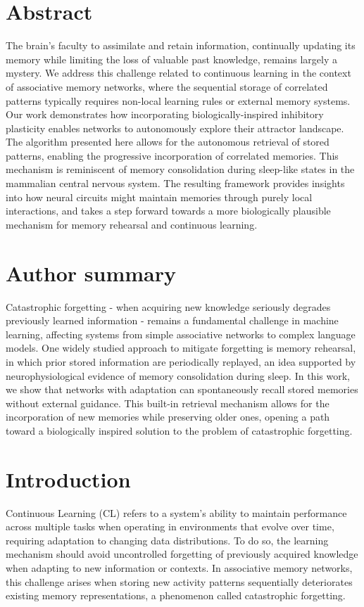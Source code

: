 \documentclass[10pt,letterpaper]{article}
\begin{document}
\section*{Abstract}
The brain's faculty to assimilate and retain information, continually updating its memory while limiting the loss of valuable past knowledge, remains largely a mystery. We address this challenge related to continuous learning in the context of associative memory networks, where the sequential storage of correlated patterns typically requires non-local learning rules or external memory systems. Our work demonstrates how incorporating biologically-inspired inhibitory plasticity enables networks to autonomously explore their attractor landscape.
The algorithm presented here allows for the autonomous retrieval of stored patterns, enabling the progressive incorporation of correlated memories. This mechanism is reminiscent of memory consolidation during sleep-like states in the mammalian central nervous system. The resulting framework provides insights into how neural circuits might maintain memories through purely local interactions, and takes a step forward towards a more biologically plausible mechanism for memory rehearsal and continuous learning.

\section*{Author summary}
Catastrophic forgetting - when acquiring new knowledge seriously degrades previously learned information - remains a fundamental challenge in machine learning, affecting systems from simple associative networks to complex language models. One widely studied approach to mitigate forgetting is memory rehearsal, in which prior stored information are periodically replayed, an idea supported by neurophysiological evidence of memory consolidation during sleep. In this work, we show that networks with adaptation can spontaneously recall stored memories without external guidance. This built-in retrieval mechanism allows for the incorporation of new memories while preserving older ones, opening a path toward a biologically inspired solution to the problem of catastrophic forgetting.

\linenumbers
\newpage
\section*{Introduction}
Continuous Learning (CL) refers to a system's ability to maintain performance across multiple tasks when operating in environments that evolve over time, requiring adaptation to changing data distributions. To do so, the learning mechanism should avoid uncontrolled forgetting of previously acquired knowledge when adapting to new information or contexts. In associative memory networks, this challenge arises when storing new activity patterns sequentially deteriorates existing memory representations, a phenomenon called catastrophic forgetting. 
\end{document}
